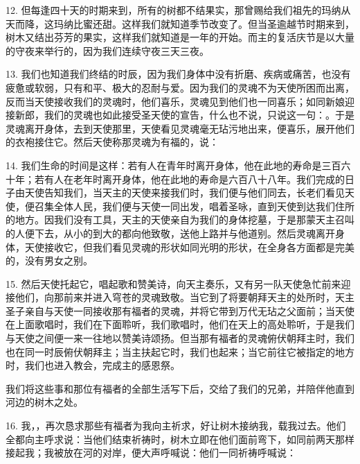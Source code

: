 12. 但每逢四十天的时期来到，所有的树都不结果实，那曾赐给我们祖先的玛纳从天而降，这玛纳比蜜还甜。这样我们就知道季节改变了。但当圣逾越节时期来到，树木又结出芬芳的果实，这样我们就知道是一年的开始。而主的复活庆节是以大量的守夜来举行的，因为我们连续守夜三天三夜。\par

13. 我们也知道我们终结的时辰，因为我们身体中没有折磨、疾病或痛苦，也没有疲惫或软弱，只有和平、极大的忍耐与爱。因为我们的灵魂不为天使所困而出离，反而当天使接收我们的灵魂时，他们喜乐，灵魂见到他们也一同喜乐；如同新娘迎接新郎，我们的灵魂也如此接受圣天使的宣告，什么也不说，只说这一句：。于是灵魂离开身体，去到天使那里，天使看见灵魂毫无玷污地出来，便喜乐，展开他们的衣袍接住它。然后天使称那灵魂为有福的，说：\par

14. 我们生命的时间是这样：若有人在青年时离开身体，他在此地的寿命是三百六十年；若有人在老年时离开身体，他在此地的寿命是六百八十八年。我们完成的日子由天使告知我们，当天主的天使来接我们时，我们便与他们同去，长老们看见天使，便召集全体人民，我们便与天使一同出发，唱着圣咏，直到天使到达我们住所的地方。因我们没有工具，天主的天使亲自为我们的身体挖墓，于是那蒙天主召叫的人便下去，从小的到大的都向他致敬，送他上路并与他道别。然后灵魂离开身体，天使接收它，但我们看见灵魂的形状如同光明的形状，在全身各方面都是完美的，没有男女之别。\par

15. 然后天使托起它，唱起歌和赞美诗，向天主奏乐，又有另一队天使急忙前来迎接他们，向那前来并进入穹苍的灵魂致敬。当它到了将要朝拜天主的处所时，天主圣子亲自与天使一同接收那有福者的灵魂，并将它带到万代无玷之父面前；当天使在上面歌唱时，我们在下面聆听，我们歌唱时，他们在天上的高处聆听，于是我们与天使之间便一来一往地以赞美诗颂扬。但当那有福者的灵魂俯伏朝拜主时，我们也在同一时辰俯伏朝拜主；当主扶起它时，我们也起来；当它前往它被指定的地方时，我们也进入教会，完成主的感恩祭。\par

我们将这些事和那位有福者的全部生活写下后，交给了我们的兄弟，并陪伴他直到河边的树木之处。\par

16. 我，，再次恳求那些有福者为我向主祈求，好让树木接纳我，载我过去。他们全都向主呼求说：当他们结束祈祷时，树木立即在他们面前弯下，如同前两天那样接起我；我被放在河的对岸，便大声呼喊说：他们一同祈祷呼喊说：\par

